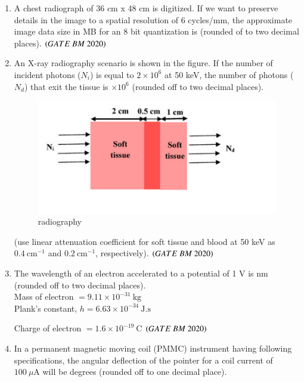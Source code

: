\documentclass[journal,12pt,onecolumn]{IEEEtran}
\theoremstyle{remark}
\begin{document}
\begin{enumerate}
\item A chest radiograph of 36 cm x 48 cm is digitized. If we want to preserve details
in the image to a spatial resolution of 6 cycles/mm, the approximate image data size in MB for an 8 bit quantization is \underline{\hspace{2cm}} (rounded of to two decimal places).  \hfill $\brak{GATE\ BM\ 2020}$

\item An X-ray radiography scenario is shown in the figure. If the number of incident 
photons ($N_i$) is equal to $2 \times 10^{6}$ at 50 keV, the number of photons ($N_d$) 
that exit the tissue is \underline{\hspace{2cm}}  $\times 10^{6}$ (rounded off to two decimal places).\\
\begin{figure}[H]
\centering
\includegraphics[width=0.4\columnwidth]{Figs/fig6.png}
\caption{radiography}
\label{fig:placeholder}
\end{figure}

(use linear attenuation coefficient for soft tissue and blood at 50 keV as 
$0.4 \ \text{cm}^{-1}$ and $0.2 \ \text{cm}^{-1}$, respectively).  \hfill $\brak{GATE\ BM\ 2020}$

\item The wavelength of an electron accelerated to a potential of 1 V is \underline{\hspace{2cm}}nm 
(rounded off to two decimal places).\\

Mass of electron $= 9.11 \times 10^{-31} \ \text{kg}$\\

Plank's constant, $h = 6.63 \times 10^{-34} \ \text{J.s}$

Charge of electron $= 1.6 \times 10^{-19} \ \text{C}$  \hfill $\brak{GATE\ BM\ 2020}$

\item In a permanent magnetic moving coil (PMMC) instrument having following 
specifications, the angular deflection of the pointer for a coil current of 
$100 \ \mu\text{A}$ will be \underline{\hspace{2cm}} degrees 
(rounded off to one decimal place).\\


\end{enumerate}
\end{document}
